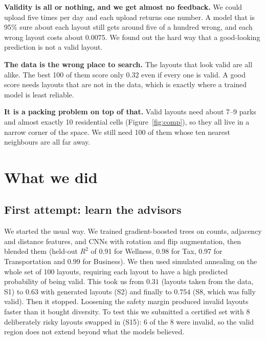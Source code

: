 \documentclass[10pt]{article}
\begin{document}
\textbf{Validity is all or nothing, and we get almost no feedback.} We could upload five times per day and each upload returns one number. A model that is 95\% sure about each layout still gets around five of a hundred wrong, and each wrong layout costs about $0.0075$. We found out the hard way that a good-looking prediction is not a valid layout.

\textbf{The data is the wrong place to search.} The layouts that look valid are all alike. The best 100 of them score only $0.32$ even if every one is valid. A good score needs layouts that are not in the data, which is exactly where a trained model is least reliable.

\textbf{It is a packing problem on top of that.} Valid layouts need about 7--9 parks and almost exactly 10 residential cells (Figure~\ref{fig:comp}), so they all live in a narrow corner of the space. We still need 100 of them whose ten nearest neighbours are all far away.

\section{What we did}

\subsection{First attempt: learn the advisors}
We started the usual way. We trained gradient-boosted trees on counts, adjacency and distance features, and CNNs with rotation and flip augmentation, then blended them (held-out $R^2$ of 0.91 for Wellness, 0.98 for Tax, 0.97 for Transportation and 0.99 for Business). We then used simulated annealing on the whole set of 100 layouts, requiring each layout to have a high predicted probability of being valid. This took us from $0.31$ (layouts taken from the data, S1) to $0.63$ with generated layouts (S2) and finally to $0.754$ (S8, which was fully valid). Then it stopped. Loosening the safety margin produced invalid layouts faster than it bought diversity. To test this we submitted a certified set with 8 deliberately risky layouts swapped in (S15): 6 of the 8 were invalid, so the valid region does not extend beyond what the models believed.
\end{document}
